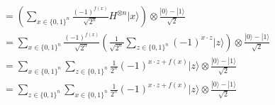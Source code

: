\documentclass{article}
\theoremstyle{definition}
\begin{document}
\begin{itemize}
\begin{align*}
    & = \left( \sum_{x \in \{0, 1\}^n} \frac{(-1)^{f(x)}}{\sqrt{2^n}} H^{\otimes n} |x\rangle \right) \otimes \frac{|0\rangle - |1\rangle}{\sqrt{2}} \\
    & = \sum_{x \in \{0, 1\}^n} \frac{(-1)^{f(x)}}{\sqrt{2^n}} \left( \frac{1}{\sqrt{2^n}} \sum_{z \in \{0, 1\}^n} (-1)^{x \cdot z} |z \rangle \right) \otimes \frac{|0\rangle - |1\rangle}{\sqrt{2}} \\
    & = \sum_{x \in \{0, 1\}^n} \sum_{z \in \{0, 1\}^n} \frac{1}{2^n} (-1)^{x \cdot z + f(x)} |z\rangle \otimes \frac{|0\rangle - |1\rangle}{\sqrt{2}} \\
    & = \sum_{z \in \{0, 1\}^n} \sum_{x \in \{0, 1\}^n} \frac{1}{2^n} (-1)^{x \cdot z + f(x)} |z\rangle \otimes \frac{|0\rangle - |1\rangle}{\sqrt{2}}
  \end{align*}
\end{itemize}
\end{document}
